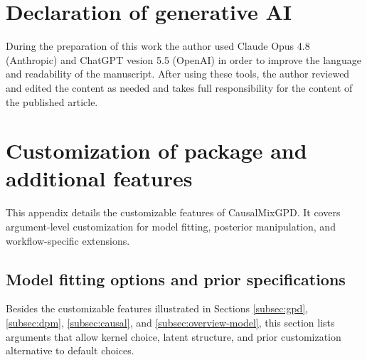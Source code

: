 \documentclass[preprint,12pt,authoryear]{elsarticle}
\newcommand{\pkg}[1]{\textsf{#1}}
\begin{document}
\section*{Declaration of generative AI}
During the preparation of this work the author used Claude Opus 4.8 (Anthropic)
and ChatGPT vesion 5.5 (OpenAI) in order to improve the language and readability of the
manuscript. After using these tools, the author reviewed and edited the content
as needed and takes full responsibility for the content of the published article.

\makeatletter
{}
\makeatother
\clearpage
\appendix
\section{Customization of package and additional features}
\label{sec:appendix-features}

This appendix details the customizable features of \pkg{CausalMixGPD}. It covers argument-level customization for model fitting, posterior manipulation, and workflow-specific extensions.

\subsection{Model fitting options and prior specifications}
\label{subsec:app-modeling}

Besides the customizable features illustrated in Sections \ref{subsec:gpd}, \ref{subsec:dpm}, \ref{subsec:causal}, and \ref{subsec:overview-model}, this section lists arguments that allow kernel choice, latent structure, and prior customization alternative to default choices.
\end{document}
